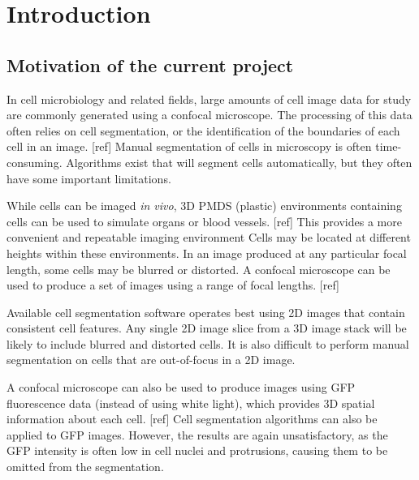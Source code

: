 
\chapter{Introduction}  %

\ifpdf
    \graphicspath{{Chapter1/Figs/Raster/}{Chapter1/Figs/PDF/}{Chapter1/Figs/}}
\else
    \graphicspath{{Chapter1/Figs/Vector/}{Chapter1/Figs/}}
\fi

\section{Motivation of the current project} %
\label{section1.1}

In cell microbiology and related fields, large amounts of cell image data for study are commonly generated using a confocal microscope. The processing of this data often relies on cell segmentation, or the identification of the boundaries of each cell in an image. [ref] Manual segmentation of cells in microscopy is often time-consuming. Algorithms exist that will segment cells automatically, but they often have some important limitations.

While cells can be imaged \emph{in vivo}, 3D PMDS (plastic) environments containing cells can be used to simulate organs or blood vessels. [ref] This provides a more convenient and repeatable imaging environment Cells may be located at different heights within these environments. In an image produced at any particular focal length, some cells may be blurred or distorted. A confocal microscope can be used to produce a set of images using a range of focal lengths. [ref]

Available cell segmentation software operates best using 2D images that contain consistent cell features. Any single 2D image slice from a 3D image stack will be likely to include blurred and distorted cells. It is also difficult to perform manual segmentation on cells that are out-of-focus in a 2D image.

A confocal microscope can also be used to produce images using GFP fluorescence data (instead of using white light), which provides 3D spatial information about each cell. [ref] Cell segmentation algorithms can also be applied to GFP images. However, the results are again unsatisfactory, as the GFP intensity is often low in cell nuclei and protrusions, causing them to be omitted from the segmentation.

